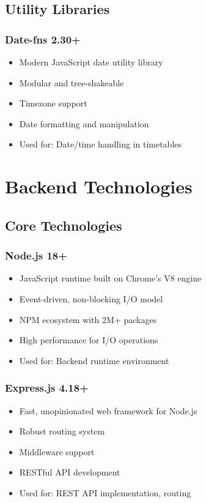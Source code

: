 \documentclass[12pt,a4paper]{report}
\begin{document}
\subsection{Utility Libraries}

\subsubsection{Date-fns 2.30+}
\begin{itemize}[leftmargin=*]
    \item Modern JavaScript date utility library
    \item Modular and tree-shakeable
    \item Timezone support
    \item Date formatting and manipulation
    \item Used for: Date/time handling in timetables
\end{itemize}

\section{Backend Technologies}

\subsection{Core Technologies}

\subsubsection{Node.js 18+}
\begin{itemize}[leftmargin=*]
    \item JavaScript runtime built on Chrome's V8 engine
    \item Event-driven, non-blocking I/O model
    \item NPM ecosystem with 2M+ packages
    \item High performance for I/O operations
    \item Used for: Backend runtime environment
\end{itemize}

\subsubsection{Express.js 4.18+}
\begin{itemize}[leftmargin=*]
    \item Fast, unopinionated web framework for Node.js
    \item Robust routing system
    \item Middleware support
    \item RESTful API development
    \item Used for: REST API implementation, routing
\end{itemize}
\end{document}
